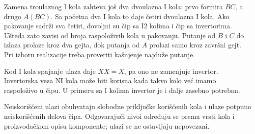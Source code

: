 Zamena troulaznog I kola zahteva još dva dvoulazna I kola: prvo formira \(BC\), a drugo \(A(BC)\).
Sa početna dva I kola to daje četiri dvoulazna I kola. Ako pakovanje sadrži sva četiri,
dovoljni su čip sa I2 kolima i čip sa invertorima. Ušteda zato zavisi od broja raspoloživih kola u pakovanju.
Putanje od \(B\) i \(C\) do izlaza prolaze kroz dva gejta, dok putanja od \(A\) prolazi samo kroz završni gejt.
Pri izboru realizacije treba proveriti kašnjenje najduže putanje.

Kod I kola spajanje ulaza daje \(XX=X\), pa ono ne zamenjuje invertor.
Invertorska veza NI kola može biti korisna kada takvo kolo već imamo raspoloživo u čipu.
U primeru sa I kolima invertor je i dalje zasebno potreban.

Neiskorišćeni ulazi obuhvataju slobodne priključke korišćenih kola i ulaze potpuno neiskorišćenih delova čipa.
Odgovarajući nivoi određuju se prema vrsti kola i proizvođačkom opisu komponente;
ulazi se ne ostavljaju nepovezani.
